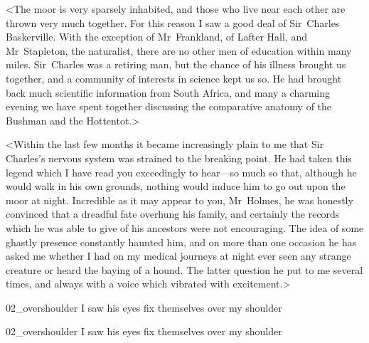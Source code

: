 \begin{withoutfootnotes}
<The moor is very sparsely inhabited, and those who live near each other are thrown very much together. For this reason I saw a good deal of Sir~Charles Baskerville. With the exception of Mr~Frankland, of Lafter Hall, and Mr~Sta\-ple\-ton, the naturalist, there are no other men of education within many miles. Sir~Charles was a retiring man, but the chance of his illness brought us together, and a community of interests in science kept us so. He had brought back much scientific information from South Africa, and many a charming evening we have spent together discussing the comparative anatomy of the Bushman and the Hottentot.>
\end{withoutfootnotes}

<Within the last few months it became increasingly plain to me that Sir Charles's nervous system was strained to the breaking point. He had taken this legend which I have read you exceedingly to hear—so much so that, although he would walk in his own grounds, nothing would induce him to go out upon the moor at night. Incredible as it may appear to you, Mr~Holmes, he was honestly convinced that a dreadful fate overhung his family, and certainly the records which he was able to give of his ancestors were not encouraging. The idea of some ghastly presence constantly haunted him, and on more than one occasion he has asked me whether I had on my medical journeys at night ever seen any strange creature or heard the baying of a hound. The latter question he put to me several times, and always with a voice which vibrated with excitement.>



\begin{letter}
	\begin{bwbigpic}
			[1.0] 
		{02_overshoulder}
		{I saw his eyes fix themselves over my shoulder}
	\end{bwbigpic}
\end{letter}
\begin{a4}
	\begin{bwbigpic}
			[1.0] 
		{02_overshoulder}
		{I saw his eyes fix themselves over my shoulder}
	\end{bwbigpic}
\end{a4}


